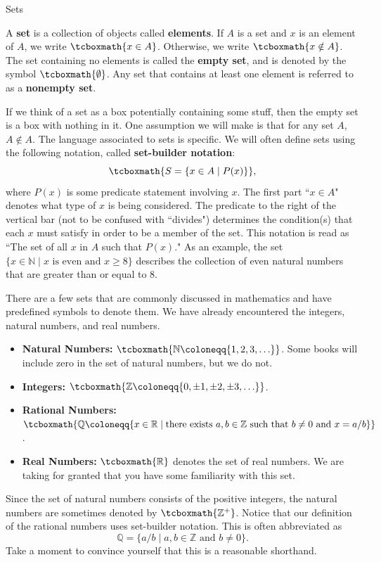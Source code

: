\begin{section}{Sets}\label{sec:Sets}

\begin{definition}
A \textbf{set} is a collection of objects called \textbf{elements}. If $A$ is a set and $x$ is an element of $A$, we write $\tcboxmath{x\in A}$. Otherwise, we write $\tcboxmath{x\notin A}$. The set containing no elements is called the \textbf{empty set}, and is denoted by the symbol $\tcboxmath{\emptyset}$. Any set that contains at least one element is referred to as a \textbf{nonempty set}.
\end{definition}

If we think of a set as a box potentially containing some stuff, then the empty set is a box with nothing in it. One assumption we will make is that for any set $A$, $A\notin A$. The language associated to sets is specific.  We will often define sets using the following notation, called \textbf{set-builder notation}:
\[
\tcboxmath{S=\{x \in A\mid P(x)\}},
\]
where $P(x)$ is some predicate statement involving $x$. The first part ``$x \in A$" denotes what type of $x$ is being considered.  The predicate to the right of the vertical bar (not to be confused with ``divides") determines the condition(s) that each $x$ must satisfy in order to be a member of the set.  This notation is read as ``The set of all $x$ in $A$ such that $P(x)$." As an example, the set $\{x\in \mathbb{N}\mid x \mbox{ is even and }x\geq 8\}$ describes the collection of even natural numbers that are greater than or equal to 8.

There are a few sets that are commonly discussed in mathematics and have predefined symbols to denote them. We have already encountered the integers, natural numbers, and real numbers.
\begin{itemize}
\item \textbf{Natural Numbers:} $\tcboxmath{\mathbb{N}\coloneqq \{1,2,3,\ldots\}}$. Some books will include zero in the set of natural numbers, but we do not.
\item \textbf{Integers:} $\tcboxmath{\mathbb{Z}\coloneqq \{0, \pm 1, \pm2, \pm 3, \ldots\}}$.
\item \textbf{Rational Numbers:} $\tcboxmath{\mathbb{Q}\coloneqq \{x\in \mathbb{R} \mid \text{there exists }a, b \in \mathbb{Z} \text{ such that } b \neq 0\text{ and }x=a/b\}}$.
\item \textbf{Real Numbers:} $\tcboxmath{\mathbb{R}}$ denotes the set of real numbers. We are taking for granted that you have some familiarity with this set. 
\end{itemize}
Since the set of natural numbers consists of the positive integers, the natural numbers are sometimes denoted by $\tcboxmath{\mathbb{Z}^+}$. Notice that our definition of the rational numbers uses set-builder notation. This is often abbreviated as
\[
\mathbb{Q} = \{a/b \mid a, b \in \mathbb{Z} \text{ and } b \neq 0\}.
\]
Take a moment to convince yourself that this is a reasonable shorthand.


\end{section}
